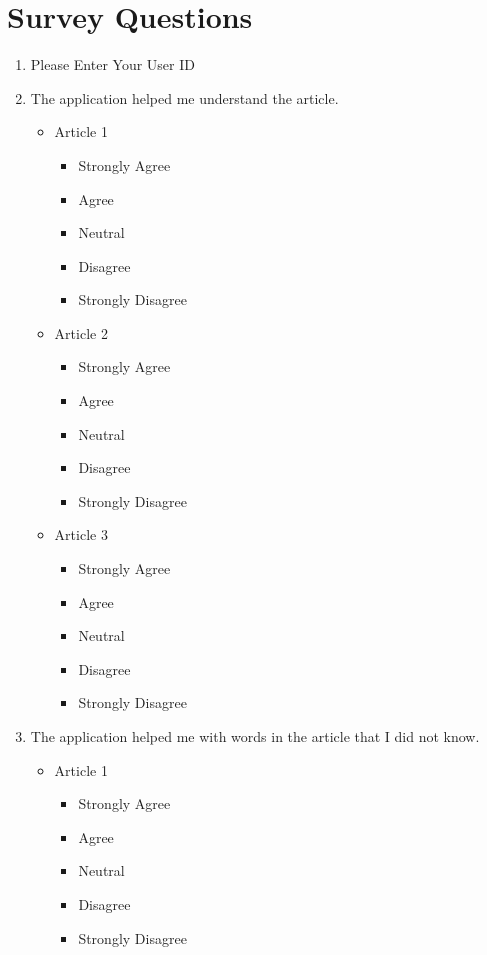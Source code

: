 \chapter{Survey Questions}

\begin{enumerate}
	\item Please Enter Your User ID
	
	\item The application helped me understand the article.
		\begin{itemize}
			\item Article 1
				\begin{itemize}
					\item Strongly Agree
					\item Agree
					\item Neutral
					\item Disagree
					\item Strongly Disagree
				\end{itemize}
				
			\item Article 2
				\begin{itemize}
					\item Strongly Agree
					\item Agree
					\item Neutral
					\item Disagree
					\item Strongly Disagree
				\end{itemize}
			
			\item Article 3
				\begin{itemize}
					\item Strongly Agree
					\item Agree
					\item Neutral
					\item Disagree
					\item Strongly Disagree
				\end{itemize}
		\end{itemize}
	
	\item The application helped me with words in the article that I did not know.
		\begin{itemize}
			\item Article 1
			\begin{itemize}
				\item Strongly Agree
				\item Agree
				\item Neutral
				\item Disagree
				\item Strongly Disagree
			\end{itemize}
			

\end{itemize}
\end{enumerate}
